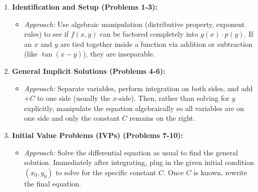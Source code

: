 \documentclass[11pt]{article}
\begin{document}
\begin{enumerate}
    \item \textbf{Identification and Setup (Problems 1-3):}
    \begin{itemize}
        \item \textit{Approach:} Use algebraic manipulation (distributive property, exponent rules) to see if $f(x,y)$ can be factored completely into $g(x) \cdot p(y)$. If an $x$ and $y$ are tied together inside a function via addition or subtraction (like $\tan(x-y)$), they are inseparable.
    \end{itemize}
    \item \textbf{General Implicit Solutions (Problems 4-6):}
    \begin{itemize}
        \item \textit{Approach:} Separate variables, perform integration on both sides, and add $+C$ to one side (usually the $x$-side). Then, rather than solving for $y$ explicitly, manipulate the equation algebraically so all variables are on one side and only the constant $C$ remains on the right.
    \end{itemize}
    \item \textbf{Initial Value Problems (IVPs) (Problems 7-10):}
    \begin{itemize}
        \item \textit{Approach:} Solve the differential equation as usual to find the general solution. Immediately after integrating, plug in the given initial condition $(x_0, y_0)$ to solve for the specific constant $C$. Once $C$ is known, rewrite the final equation.
    \end{itemize}
\end{enumerate}
\end{document}

